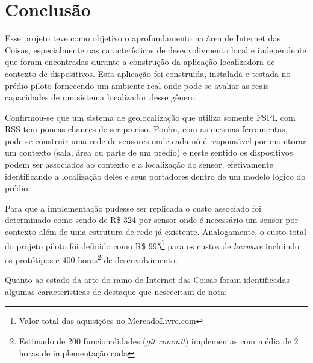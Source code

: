 \chapter{Conclusão}
\label{chap:Conclusao}


Esse projeto teve como objetivo o aprofundamento na área de Internet das Coisas,
especialmente nas características de desenvolivmento local e independente que
foram encontradas durante a construção da aplicação localizadora de contexto de
dispositivos. Esta aplicação foi construida, instalada e testada no prédio
piloto fornecendo um ambiente real onde pode-se avaliar as reais capacidades de
um sistema localizador desse gênero.

Confirmou-se que um sistema de
geolocalização que utiliza somente FSPL com RSS tem poucas chances de ser
preciso. Porém, com as mesmas ferramentas, pode-se construir uma rede de sensores
onde cada nó é responsável por monitorar um contexto (sala, área ou parte de um
prédio) e neste sentido os dispositivos podem ser associados ao contexto e a
localização do sensor, efetivamente identificando a localização deles
e seus portadores dentro de um modelo lógico do prédio.

Para que a implementação pudesse ser replicada o custo associado foi determinado
como sendo de R\$ 324 por sensor onde é necessário um sensor por contexto além
de uma estrutura de rede já existente. Analogamente, o custo total do projeto
piloto foi definido como R\$ 995\footnote{Valor total das aquisições no
MercadoLivre.com} para os custos de \emph{harware} incluindo os protótipos e 400
horas\footnote{Estimado de 200 funcionalidades (\emph{git commit}) implementas
com média de 2 horas de implementação cada} de desenvolvimento.

Quanto ao estado da arte do ramo de Internet das Coisas foram identificadas
algumas características de destaque que nescecitam de nota:

